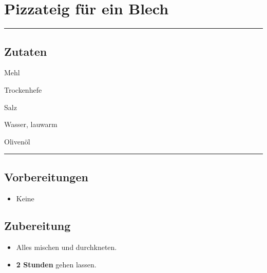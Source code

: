 \section*{Pizzateig für ein Blech}

\bigbreak
\rule{\textwidth}{0.4pt}

\subsection*{Zutaten}

\begin{description}[align=right,leftmargin=!,labelwidth=\widthof{\bfseries xxPrisen}]
    \item[330g] Mehl
    \item[1 Pkg] Trockenhefe
    \item[$\frac{3}{4}$ TL] Salz
    \item[195ml] Wasser, lauwarm
    \item[5 TL] Olivenöl
\end{description}


\rule{\textwidth}{0.4pt}


\subsection*{Vorbereitungen}

\begin{itemize}
    \item Keine
\end{itemize}


\bigbreak
\subsection*{Zubereitung}

\begin{itemize}
    \item Alles mischen und durchkneten.
    \item \textbf{2 Stunden} gehen lassen.
\end{itemize}
